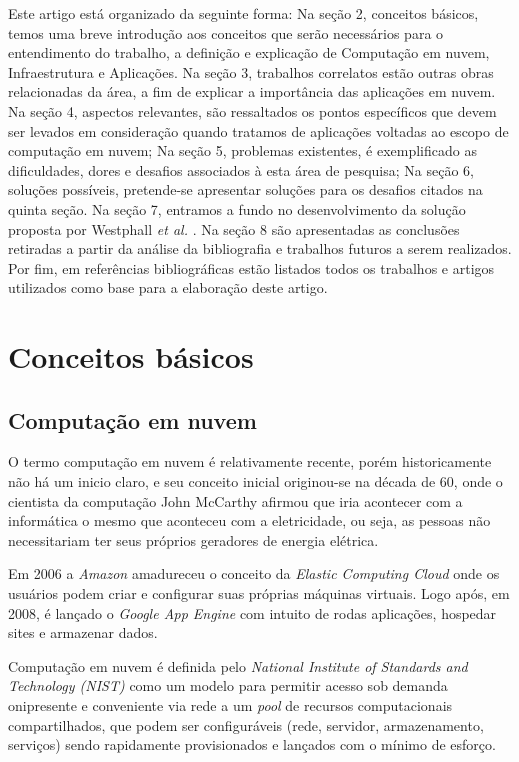 \documentclass[12pt]{article}
\begin{document}
Este artigo está organizado da seguinte forma:
Na seção 2, conceitos básicos, temos uma breve introdução aos conceitos que serão necessários para o entendimento do trabalho, a definição e explicação de Computação em nuvem, Infraestrutura e Aplicações. Na seção 3, trabalhos correlatos estão outras obras relacionadas da área, a fim de explicar a importância das aplicações em nuvem. Na seção 4, aspectos relevantes, são ressaltados os pontos específicos que devem ser levados em consideração quando tratamos de aplicações voltadas ao escopo de computação em nuvem; Na seção 5, problemas existentes, é exemplificado as dificuldades, dores e desafios associados à esta área de pesquisa; Na seção 6, soluções possíveis, pretende-se apresentar soluções para os desafios citados na quinta seção.  Na seção 7, entramos a fundo no desenvolvimento da solução proposta por Westphall \emph{et al.} \cite{westphall}. Na seção 8 são apresentadas as conclusões retiradas a partir da análise da bibliografia e trabalhos futuros a serem realizados. Por fim, em referências bibliográficas estão listados todos os trabalhos e artigos utilizados como base para a elaboração deste artigo.

\section{Conceitos básicos}

\subsection{Computação em nuvem}

O termo computação em nuvem é relativamente recente, porém historicamente não há um inicio claro, e seu conceito inicial originou-se na década de 60, onde o cientista da computação John McCarthy afirmou que iria acontecer com a informática o mesmo que aconteceu com a eletricidade, ou seja, as pessoas não necessitariam ter seus próprios geradores de energia elétrica.

Em 2006 a \emph{Amazon} amadureceu o conceito da \emph{Elastic Computing Cloud} onde os usuários podem criar e configurar suas próprias máquinas virtuais. Logo após, em 2008, é lançado o \emph{Google App Engine} com intuito de rodas aplicações, hospedar sites e armazenar dados.

Computação em nuvem é definida pelo \emph{National Institute of Standards and Technology (NIST)} como um modelo para permitir acesso sob demanda onipresente e conveniente via rede a um \emph{pool} de recursos computacionais compartilhados, que podem ser configuráveis (rede, servidor, armazenamento, serviços) sendo rapidamente provisionados e lançados com o mínimo de esforço.
\end{document}
